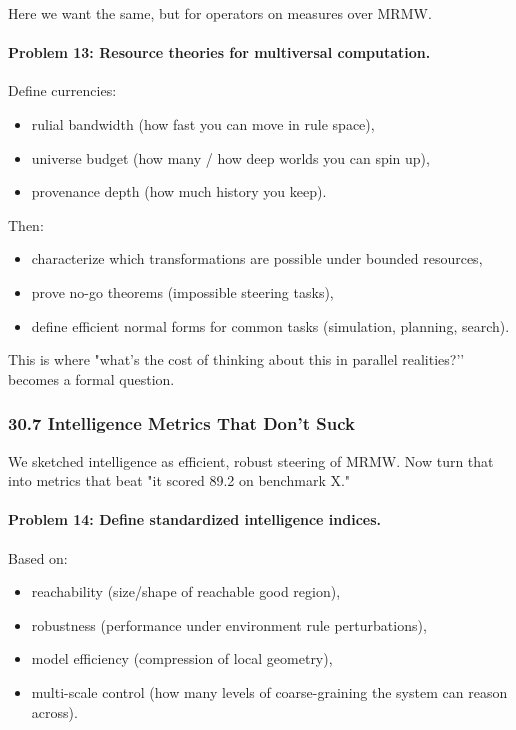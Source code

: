 Here we want the same, but for operators on measures over MRMW.

\paragraph{Problem 13: Resource theories for multiversal computation.}

Define currencies:

\begin{itemize}
  \item rulial bandwidth (how fast you can move in rule space),
  \item universe budget (how many / how deep worlds you can spin up),
  \item provenance depth (how much history you keep).
\end{itemize}

Then:

\begin{itemize}
  \item characterize which transformations are possible under bounded resources,
  \item prove no-go theorems (impossible steering tasks),
  \item define efficient normal forms for common tasks (simulation, planning, search).
\end{itemize}

This is where "what’s the cost of thinking about this in parallel realities?’’ becomes a formal question.

\subsubsection*{30.7  Intelligence Metrics That Don’t Suck}

We sketched intelligence as efficient, robust steering of MRMW.
Now turn that into metrics that beat "it scored 89.2 on benchmark X."

\paragraph{Problem 14: Define standardized intelligence indices.}

Based on:

\begin{itemize}
  \item reachability (size/shape of reachable good region),
  \item robustness (performance under environment rule perturbations),
  \item model efficiency (compression of local geometry),
  \item multi-scale control (how many levels of coarse-graining the system can reason across).
\end{itemize}

